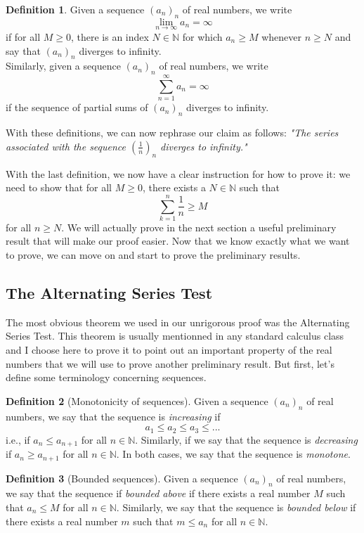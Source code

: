 \documentclass[12pt]{article}
\newcommand{\N}{\mathbb{N}}
\theoremstyle{definition}
\newtheorem*{definition}{Definition}
\newcounter{prop}[section]
\begin{document}
\begin{definition}
    Given a sequence $(a_n)_n$ of real numbers, we write
    $$\lim_{n \rightarrow \infty}a_n = \infty$$
    if for all $M \geq 0$, there is an index $N \in \N$ for which $a_n \geq M$ whenever $n \geq N$ and say that $(a_n)_n$ diverges to infinity. \\
    Similarly, given a sequence $(a_n)_n$ of real numbers, we write
    $$\sum_{n=1}^{\infty}a_n = \infty$$
    if the sequence of partial sums of $(a_n)_n$ diverges to infinity.\\
\end{definition}

With these definitions, we can now rephrase our claim as follows: \textit{"The series associated with the sequence $(\frac{1}{n})_n$ diverges to infinity." } 

With the last definition, we now have a clear instruction for how to prove it: we need to show that for all $M \geq 0$, there exists a $N \in \N$ such that
$$\sum_{k=1}^{n}\frac{1}{n} \geq M$$
for all $n \geq N$. We will actually prove in the next section a useful preliminary result that will make our proof easier. Now that we know exactly what we want to prove, we can move on and start to prove the preliminary results.

\subsection{The Alternating Series Test}

The most obvious theorem we used in our unrigorous proof was the Alternating Series Test. This theorem is usually mentionned in any standard calculus class and I choose here to prove it to point out an important property of the real numbers that we will use to prove another preliminary result. But first, let's define some terminology concerning sequences.

\begin{definition}[Monotonicity of sequences]
    Given a sequence $(a_n)_n$ of real numbers, we say that the sequence is \textit{increasing} if
    $$a_1 \leq a_2 \leq a_3 \leq ... $$
    i.e., if $a_n \leq a_{n+1}$ for all $n \in \N$. Similarly, if we say that the sequence is \textit{decreasing} if $a_n \geq a_{n+1}$ for all $n \in \N$. In both cases, we say that the sequence is \textit{monotone}.
\end{definition}

\begin{definition}[Bounded sequences]
    Given a sequence $(a_n)_n$ of real numbers, we say that the sequence if \textit{bounded above} if there exists a real number $M$ such that $a_n \leq M$ for all $n \in \N$. Similarly, we say that the sequence is \textit{bounded below} if there exists a real number $m$ such that $m \leq a_n$ for all $n \in \N$.
\end{definition}
\end{document}
